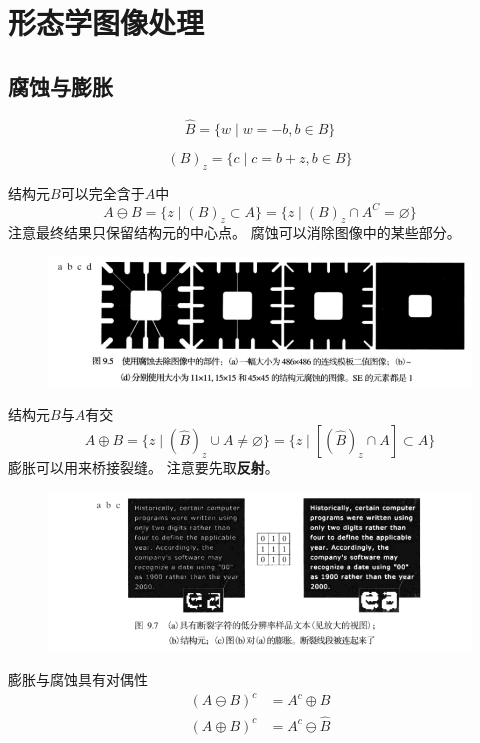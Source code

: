 
\section{形态学图像处理} %
\subsection{腐蚀与膨胀}
\begin{definition}[反射]
\[\hat{B}=\{w\mid w=-b,b\in B\}\]
\end{definition}
\begin{definition}[平移]
\[(B)_z=\{c\mid c=b+z,b\in B\}\]
\end{definition}
\begin{definition}[腐蚀]
结构元$B$可以完全含于$A$中
\[A\ominus B=\{z\mid(B)_z\subset A\}=\{z\mid(B)_z\cap A^C=\varnothing\}\]
注意最终结果只保留结构元的中心点。
腐蚀可以消除图像中的某些部分。
\end{definition}
\begin{figure}[H]
\centering
\includegraphics[width=0.9\linewidth]{fig/erosion.png}
\end{figure}
\begin{definition}[膨胀]
结构元$B$与$A$有交
\[A\oplus B=\{z\mid(\hat{B})_z\cup A\ne\varnothing\}=\{z\mid [(\hat{B})_z\cap A]\subset A\}\]
膨胀可以用来桥接裂缝。
注意要先取\textbf{反射}。
\end{definition}
\begin{figure}[H]
\centering
\includegraphics[width=0.9\linewidth]{fig/dilation.png}
\end{figure}

膨胀与腐蚀具有对偶性
\[\begin{aligned}
(A\ominus B)^c &= A^c\oplus B\\
(A\oplus B)^c &= A^c\ominus \hat{B}
\end{aligned}\]

